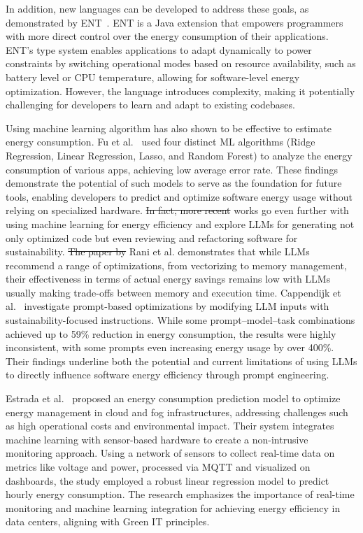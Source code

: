 In addition, new languages can be developed to address these goals, as demonstrated by ENT~\cite{10.1145/3062341.3062356}. ENT is a Java extension that empowers programmers with more direct control over the energy consumption of their applications. ENT’s type system enables applications to adapt dynamically to power constraints by switching operational modes based on resource availability, such as battery level or CPU temperature, allowing for software-level energy optimization. However, the language introduces complexity, making it potentially challenging for developers to learn and adapt to existing codebases. 

Using machine learning algorithm has also shown to be effective to estimate energy consumption. Fu et al.~\cite{8726531} used four distinct ML algorithms (Ridge Regression, Linear Regression, Lasso, and Random Forest) to analyze the energy consumption of various apps, achieving low average error rate. These findings demonstrate the potential of such models to serve as the foundation for future tools, enabling developers to predict and optimize software energy usage without relying on specialized hardware. {\color{blue}\st{In fact, more recent}  works go even further with using machine learning for energy efficiency and explore LLMs for generating not only optimized code but even reviewing and refactoring software for sustainability. \st{The paper by} Rani et al.\cite{rani2024green} demonstrates that while LLMs recommend a range of optimizations, from vectorizing to memory management, their effectiveness in terms of actual energy savings remains low with LLMs usually making trade-offs between memory and execution time. Cappendijk et al.~\cite{cappendijk2024generating} investigate prompt-based optimizations by modifying LLM inputs with sustainability-focused instructions. While some prompt–model–task combinations achieved up to 59\% reduction in energy consumption, the results were highly inconsistent, with some prompts even increasing energy usage by over 400\%. Their findings underline both the potential and current limitations of using LLMs to directly influence software energy efficiency through prompt engineering. }


Estrada et al.~\cite{estrada2022learning} proposed an energy consumption prediction model to optimize energy management in cloud and fog infrastructures, addressing challenges such as high operational costs and environmental impact. Their system integrates machine learning with sensor-based hardware to create a non-intrusive monitoring approach. Using a network of sensors to collect real-time data on metrics like voltage and power, processed via MQTT and visualized on dashboards, the study employed a robust linear regression model to predict hourly energy consumption. The research emphasizes the importance of real-time monitoring and machine learning integration for achieving energy efficiency in data centers, aligning with Green IT principles.

